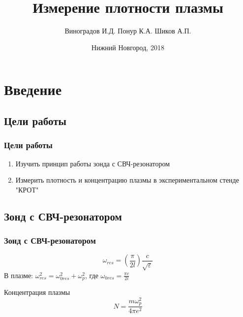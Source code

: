 \documentclass[10pt,pdf,hyperref={unicode}, dvipsnames]{beamer}
\title[Измерение плотности плазмы]{Измерение плотности плазмы}
\author{%
	Виноградов И.Д. %
	Понур К.А. %
	Шиков А.П. %
}
\institute{Радиофизический факультет ННГУ, 430 группа}
\date{Нижний Новгород, 2018}
\begin{document}
  

\section{Введение}
\subsection{Цели работы}
\begin{frame}[t]
	\frametitle{Цели работы}
	
		\vfill

		\begin{enumerate}
			\item Изучить принцип работы зонда с СВЧ-резонатором
			\item Измерить плотность и концентрацию плазмы в экспериментальном стенде "КРОТ"
		\end{enumerate}
		\vfill

\end{frame}

		
	

\subsection{Зонд с СВЧ-резонатором} %

\begin{frame}
	\frametitle{Зонд с СВЧ-резонатором}
	\begin{equation}
		\omega_{res}=\left(\frac\pi{2l}\right)\frac c{\sqrt{\varepsilon}}
	\end{equation}
	В плазме: $\omega_{res}^2=\omega_{0res}^2+\omega_p^2$, 
	где $\omega_{0res}=\frac{\pi c}{2l}$

	Концентрация плазмы
	\begin{equation}
		N=\frac{m\omega^2_p}{4\pi e^2}
	\end{equation}
\end{frame}
\end{document}
